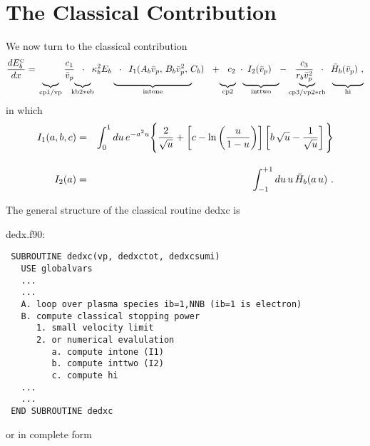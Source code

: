 \documentclass[preprint,12pt,eqsecnum,nofootinbib,amsmath,amssymb]{revtex4}
\newcommand{\smC}{{\rm\scriptscriptstyle C}}
\begin{document}
\newpage
\section{The Classical Contribution}

We now turn to the classical contribution
\begin{eqnarray}
  {dE^\smC_b \over dx}&=&
  \frac{c_1}{\bar v_p}\hskip0.2cm\cdot\hskip0.2cm
  \kappa^2_b E_b \hskip0.2cm\cdot\hskip0.2cm
   I_1(A_b \bar v_p,\, B_b \bar v_p^2, \, C_b) 
  ~~+~~
  c_2\hskip0.1cm\cdot\hskip0.1cm I_2(\bar v_p)
  ~~-~~ 
  \frac{c_3}{r_b \bar v_p^2} \hskip0.2cm\cdot\hskip0.2cm
   \bar H_b(\bar v_p) \ ,
\\[-12pt]\nonumber  &&
  \hskip-0.2cm\underbrace{\hskip0.3cm}_{{\rm cp1/vp}}
  \hskip0.3cm \underbrace{\hskip0.5cm}_{{\rm kb2*eb}}
  \hskip0.7cm \underbrace{\hskip3cm}_{{\rm intone}}
  \hskip1.0cm\underbrace{\hskip0.3cm}_{{\rm cp2}}
  \hskip0.2cm \underbrace{\hskip1.4cm}_{{\rm inttwo}}
  \hskip0.3cm\underbrace{\hskip0.3cm}_{{\rm cp3/vp2*rb}}
  \hskip0.2cm \underbrace{\hskip1.2cm}_{{\rm hi}}
\end{eqnarray}
in which 
\begin{eqnarray}
  I_1(a,b,c) &=&
  \int_0^1 du \,e^{ -a^2 u }
  \Bigg\{ \frac{2}{\sqrt{u}} + \left[ c - \ln \left(  
  { u \over 1-u} \right)  \right]\left[  b\,\sqrt{u} 
  -  \frac{1}{\sqrt{u}} \right] \Bigg\} 
\nonumber\\[10pt]
  I_2(a) &=&
  \int_{-1}^{+1} du \, u \,\bar H_b(a \,u)  \ .
\end{eqnarray}

\noindent
The general structure of the classical routine dedxc is 

\vskip0.3cm 
{
\noindent
dedx.f90:
\baselineskip12pt
\begin{verbatim}
 SUBROUTINE dedxc(vp, dedxctot, dedxcsumi)
   USE globalvars
   ...
   ...
   A. loop over plasma species ib=1,NNB (ib=1 is electron)
   B. compute classical stopping power
      1. small velocity limit
      2. or numerical evalulation
         a. compute intone (I1)
         b. compute inttwo (I2)
         c. compute hi
   ...
   ...
 END SUBROUTINE dedxc
\end{verbatim}
}
\vskip0.2cm

\noindent
or in complete form
\end{document}

